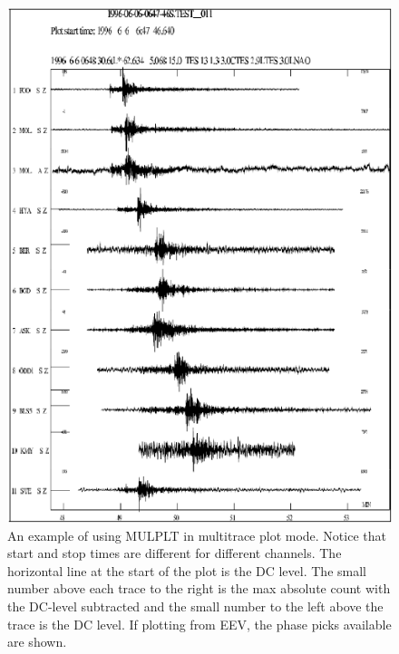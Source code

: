 \begin{figure}
\centerline{\includegraphics[width=0.9\linewidth]{fig/fig17}}
\caption{
An example of using MULPLT in multitrace plot mode. Notice that start and stop times are different for different channels. The horizontal line at the start of the plot is the DC level. The small number above each trace to the right is the max absolute count with the DC-level subtracted and the small number to the left above the trace is the DC level. If plotting from EEV, the phase picks available are shown. 
}
\label{fig:mulplt-multitrace}
\end{figure}

